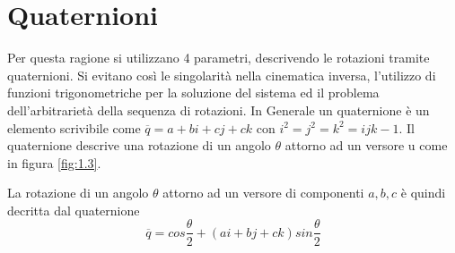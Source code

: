 \section{Quaternioni}
Per questa ragione si utilizzano 4 parametri, descrivendo le rotazioni tramite quaternioni. Si evitano così le singolarità nella cinematica inversa, l'utilizzo di funzioni trigonometriche per la soluzione del sistema ed il problema dell'arbitrarietà della sequenza di rotazioni.
In Generale un quaternione è un elemento scrivibile come $ \overline{q} = a + bi + cj+ ck$ con $i^2=j^2=k^2 = ijk -1$. \newline Il quaternione descrive una rotazione di un angolo $\theta$ attorno ad un versore u come in figura \ref{fig:1.3}.

La rotazione di un angolo $\theta$ attorno ad un versore di componenti ${a, b, c}$ è quindi decritta dal quaternione
\begin{equation} 
    \overline{q} = cos\frac{\theta}{2} + (ai + bj + ck)sin\frac{\theta}{2}
\end{equation}{}

